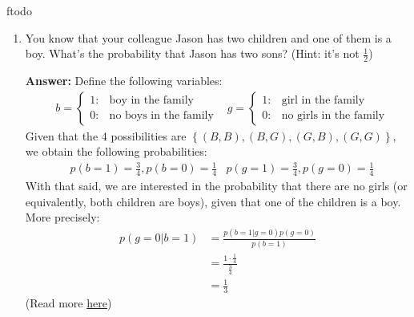 ƒtodo\documentclass{article}
\newenvironment{QandA}{\begin{enumerate}[label=\arabic*.]}{\end{enumerate}}
\newenvironment{answer}{\par\normalfont \textbf{Answer:}}{}
\newcommand{\g}{\vert}
\begin{document}
\begin{QandA}
    \item You know that your colleague Jason has two children and one of them is a boy. What’s the probability that Jason has two sons? (Hint: it’s not $\frac{1}{2}$)
    \begin{answer}
        Define the following variables:
        \begin{align*}
            &b = \begin{cases}
                1: &\text{boy in the family} \\
                0: &\text{no boys in the family}
            \end{cases}
            &g = \begin{cases}
                1: &\text{girl in the family} \\
                0: &\text{no girls in the family}
            \end{cases}
        \end{align*}
        Given that the 4 possibilities are $\left\{ (B, B), (B, G), (G, B), (G, G) \right\}$, we obtain the following probabilities:
        \begin{align*}
            &p(b=1) = \frac{3}{4}, p(b=0) = \frac{1}{4} &p(g=1) = \frac{3}{4}, p(g=0) = \frac{1}{4}
        \end{align*}
        With that said, we are interested in the probability that there are no girls (or equivalently, both children are boys), given that one of the children is a boy. More precisely:
        \begin{align*}
            p(g=0 \g b = 1) &= \frac{p(b=1 \g g = 0) p(g=0)}{p(b=1)} \\
            &= \frac{1 \cdot \frac{1}{4}}{\frac{3}{4}} \\
            &= \frac{1}{3}
        \end{align*}
        (Read more \href{https://en.wikipedia.org/wiki/Boy_or_Girl_paradox}{here})
    \end{answer}
    

\end{QandA}
\end{document}
